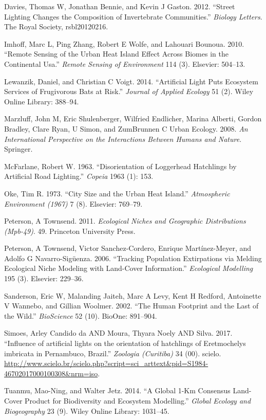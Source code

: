 \documentclass[]{article}
\begin{document}
\hypertarget{ref-davies2012street}{}
Davies, Thomas W, Jonathan Bennie, and Kevin J Gaston. 2012. ``Street
Lighting Changes the Composition of Invertebrate Communities.''
\emph{Biology Letters}. The Royal Society, rsbl20120216.

\hypertarget{ref-imhoff2010remote}{}
Imhoff, Marc L, Ping Zhang, Robert E Wolfe, and Lahouari Bounoua. 2010.
``Remote Sensing of the Urban Heat Island Effect Across Biomes in the
Continental Usa.'' \emph{Remote Sensing of Environment} 114 (3).
Elsevier: 504--13.

\hypertarget{ref-lewanzik2014artificial}{}
Lewanzik, Daniel, and Christian C Voigt. 2014. ``Artificial Light Puts
Ecosystem Services of Frugivorous Bats at Risk.'' \emph{Journal of
Applied Ecology} 51 (2). Wiley Online Library: 388--94.

\hypertarget{ref-marzluff2008international}{}
Marzluff, John M, Eric Shulenberger, Wilfried Endlicher, Marina Alberti,
Gordon Bradley, Clare Ryan, U Simon, and ZumBrunnen C Urban Ecology.
2008. \emph{An International Perspective on the Interactions Between
Humans and Nature}. Springer.

\hypertarget{ref-mcfarlane1963disorientation}{}
McFarlane, Robert W. 1963. ``Disorientation of Loggerhead Hatchlings by
Artificial Road Lighting.'' \emph{Copeia} 1963 (1): 153.

\hypertarget{ref-oke1973city}{}
Oke, Tim R. 1973. ``City Size and the Urban Heat Island.''
\emph{Atmospheric Environment (1967)} 7 (8). Elsevier: 769--79.

\hypertarget{ref-peterson2011ecological}{}
Peterson, A Townsend. 2011. \emph{Ecological Niches and Geographic
Distributions (Mpb-49)}. 49. Princeton University Press.

\hypertarget{ref-peterson2006tracking}{}
Peterson, A Townsend, Victor Sanchez-Cordero, Enrique Martínez-Meyer,
and Adolfo G Navarro-Sigüenza. 2006. ``Tracking Population Extirpations
via Melding Ecological Niche Modeling with Land-Cover Information.''
\emph{Ecological Modelling} 195 (3). Elsevier: 229--36.

\hypertarget{ref-sanderson2002human}{}
Sanderson, Eric W, Malanding Jaiteh, Marc A Levy, Kent H Redford,
Antoinette V Wannebo, and Gillian Woolmer. 2002. ``The Human Footprint
and the Last of the Wild.'' \emph{BioScience} 52 (10). BioOne: 891--904.

\hypertarget{ref-SIMOES2017}{}
Simoes, Arley Candido da AND Moura, Thyara Noely AND Silva. 2017.
``Influence of artificial lights on the orientation of hatchlings of
Eretmochelys imbricata in Pernambuco, Brazil.'' \emph{Zoologia
(Curitiba)} 34 (00). scielo.
\url{http://www.scielo.br/scielo.php?script=sci_arttext\&pid=S1984-46702017000100308\&nrm=iso}.

\hypertarget{ref-tuanmu2014global}{}
Tuanmu, Mao-Ning, and Walter Jetz. 2014. ``A Global 1-Km Consensus
Land-Cover Product for Biodiversity and Ecosystem Modelling.''
\emph{Global Ecology and Biogeography} 23 (9). Wiley Online Library:
1031--45.
\end{document}

